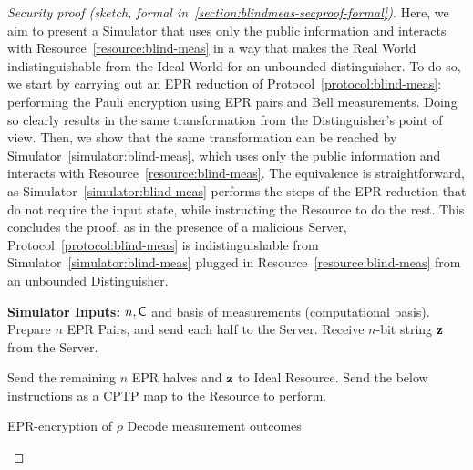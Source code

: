 \begin{proof}[Security proof (sketch, formal in~\ref{section:blindmeas-secproof-formal})]
     Here, we aim to present a Simulator that uses only the public information and interacts with Resource~\ref{resource:blind-meas} in a way that makes the Real World indistinguishable from the Ideal World for an unbounded distinguisher.
     To do so, we start by carrying out an EPR reduction of Protocol~\ref{protocol:blind-meas}: performing the Pauli encryption using EPR pairs and Bell measurements. Doing so clearly results in the same transformation from the Distinguisher's point of view. Then, we show that the same transformation can be reached by Simulator~\ref{simulator:blind-meas}, which uses only the public information and interacts with Resource~\ref{resource:blind-meas}. The equivalence is straightforward, as Simulator~\ref{simulator:blind-meas} performs the steps of the EPR reduction that do not require the input state, while instructing the Resource to do the rest.
     This concludes the proof, as in the presence of a malicious Server, Protocol~\ref{protocol:blind-meas} is indistinguishable from Simulator~\ref{simulator:blind-meas} plugged in Resource~\ref{resource:blind-meas} from an unbounded Distinguisher.

\begin{simulatorr}
    \caption{Blind Measurements}
    \label{simulator:blind-meas}
    \begin{algorithmic}[1]
        \State \textbf{Simulator Inputs:} $n, \mathsf{C}$ and basis of measurements (computational basis).
        \State Prepare $n$ EPR Pairs, and send each half to the Server.
        \State Receive $n$-bit string $\mathbf z$ from the Server.
        \EndProcedure

        \State Send the remaining $n$ EPR halves and $\mathbf z$ to Ideal Resource.
        \State Send the below instructions as a CPTP map to the Resource to perform.
        \EndProcedure

        \State EPR-encryption of $\rho$
        \State Decode measurement outcomes
        \EndProcedure
    \end{algorithmic}
\end{simulatorr} \end{proof}

